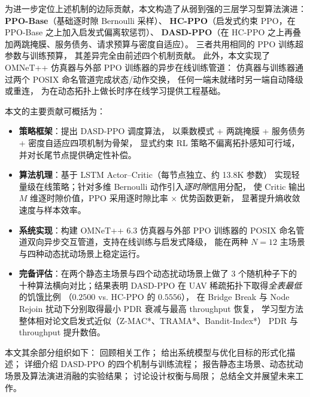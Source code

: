 为进一步定位上述机制的边际贡献，本文构造了从弱到强的三层学习型算法演进：
\textbf{PPO-Base}（基础逐时隙 Bernoulli 采样）、
\textbf{HC-PPO}（启发式约束 PPO，在 PPO-Base 之上加入启发式偏离软惩罚）、
\textbf{DASD-PPO}（在 HC-PPO 之上再叠加两跳掩膜、服务债务、请求预算与密度自适应）。
三者共用相同的 PPO 训练超参数与训练预算，
其差异完全由前述四个机制贡献。
此外，本文实现了 OMNeT++ 仿真器与外部 PPO 训练器的异步在线训练管道：
仿真器与训练器通过两个 POSIX 命名管道完成状态/动作交换，
任何一端未就绪时另一端自动降级或重连，
为在动态拓扑上做长时序在线学习提供工程基础。

本文的主要贡献可概括为：
\begin{itemize}
    \item \textbf{策略框架}：提出 DASD-PPO 调度算法，
          以乘数模式 + 两跳掩膜 + 服务债务 + 密度自适应四项机制为骨架，
          显式约束 RL 策略不偏离拓扑感知可行域，
          并对长尾节点提供确定性补偿。
    \item \textbf{算法机理}：基于 LSTM Actor--Critic（每节点独立、约 13.8K 参数）
          实现轻量级在线策略；针对多维 Bernoulli 动作引入\emph{逐时隙}信用分配，
          使 Critic 输出 \(M\) 维逐时隙价值，PPO 采用逐时隙比率 \(\times\) 优势函数更新，
          显著提升熵收敛速度与样本效率。
    \item \textbf{系统实现}：构建 OMNeT++ 6.3 仿真器与外部 PPO 训练器的
          POSIX 命名管道双向异步交互管道，支持在线训练与启发式降级，
          能在两种 \(N=12\) 主场景与四种动态扰动场景上稳定运行。
    \item \textbf{完备评估}：在两个静态主场景与四个动态扰动场景上做了 3 个随机种子下的
          十种算法横向对比；结果表明 DASD-PPO 在 UAV 稀疏拓扑下取得\emph{全表最低}的饥饿比例
          （\(0.2500\) vs. HC-PPO 的 \(0.5556\)），
          在 Bridge Break 与 Node Rejoin 扰动下分别取得最小 PDR 衰减与最高 throughput 恢复，
          学习型方法整体相对论文启发式近似（Z-MAC*、TRAMA*、Bandit-Index*）
          PDR 与 throughput 提升数倍。
\end{itemize}

本文其余部分组织如下：
 回顾相关工作；
 给出系统模型与优化目标的形式化描述；
 详细介绍 DASD-PPO 的四个机制与训练流程；
 报告静态主场景、动态扰动场景及算法演进消融的实验结果；
 讨论设计权衡与局限；
 总结全文并展望未来工作。
